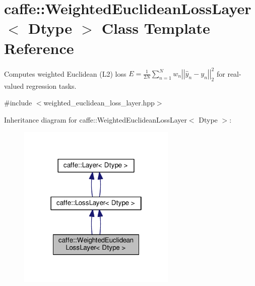 \hypertarget{classcaffe_1_1_weighted_euclidean_loss_layer}{}\section{caffe\+:\+:Weighted\+Euclidean\+Loss\+Layer$<$ Dtype $>$ Class Template Reference}
\label{classcaffe_1_1_weighted_euclidean_loss_layer}


Computes weighted Euclidean (L2) loss $ E = \frac{1}{2N} \sum\limits_{n=1}^N w_n \left| \left| \hat{y}_n - y_n \right| \right|_2^2 $ for real-\/valued regression tasks.  




{\ttfamily \#include $<$weighted\+\_\+euclidean\+\_\+loss\+\_\+layer.\+hpp$>$}



Inheritance diagram for caffe\+:\+:Weighted\+Euclidean\+Loss\+Layer$<$ Dtype $>$\+:
\nopagebreak
\begin{figure}[H]
\begin{center}
\leavevmode
\includegraphics[width=214pt]{classcaffe_1_1_weighted_euclidean_loss_layer__inherit__graph}
\end{center}
\end{figure}
